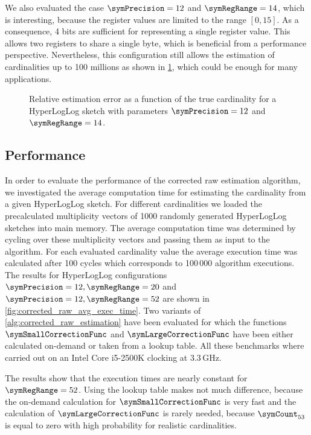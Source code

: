 \documentclass[a4paper]{scrartcl}
\begin{document}
We also evaluated the case $\symPrecision = 12$ and $\symRegRange=14$, which is interesting, because the register values are limited to the range $[0, 15]$. As a consequence, 4 bits are sufficient for representing a single register value. This allows two registers to share a single byte, which is beneficial from a performance perspective. Nevertheless, this configuration still allows the estimation of cardinalities up to 100 millions as shown in \cref{fig:raw_corrected_estimation_error_12_14}, which could be enough for many applications.

\begin{figure}
\centering

\caption{Relative estimation error as a function of the true cardinality for a HyperLogLog sketch with parameters $\symPrecision = 12$ and $\symRegRange=14$.}
\label{fig:raw_corrected_estimation_error_12_14}
\end{figure}

\subsection{Performance}
\label{sec:corrected_raw_estimation_algorithm}
In order to evaluate the performance of the corrected raw estimation algorithm, we investigated the average computation time for estimating the cardinality from a given HyperLogLog sketch. For different cardinalities we loaded the precalculated multiplicity vectors of 1000 randomly generated HyperLogLog sketches into main memory. The average computation time was determined by cycling over these multiplicity vectors and passing them as input to the algorithm. For each evaluated cardinality value the average execution time was calculated after 100 cycles which corresponds to 100\,000 algorithm executions. The results for HyperLogLog configurations $\symPrecision=12, \symRegRange=20$ and $\symPrecision=12, \symRegRange=52$ are shown in \cref{fig:corrected_raw_avg_exec_time}. Two variants of \cref{alg:corrected_raw_estimation} have been evaluated for which the functions $\symSmallCorrectionFunc$ and $\symLargeCorrectionFunc$ have been either calculated on-demand or taken from a lookup table. All these benchmarks where carried out on an Intel Core i5-2500K clocking at 3.3\,GHz. 

The results show that the execution times are nearly constant for $\symRegRange=52$. Using the lookup table makes not much difference, because the on-demand calculation for  $\symSmallCorrectionFunc$ is very fast and the calculation of $\symLargeCorrectionFunc$ is rarely needed, because $\symCount_{53}$ is equal to zero with high probability for realistic cardinalities.
\end{document}
